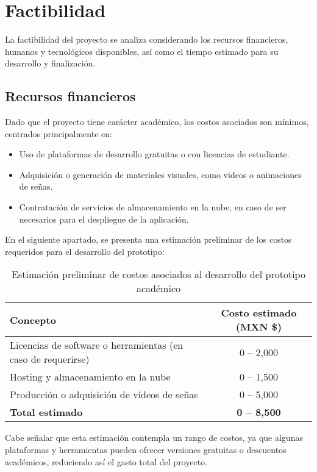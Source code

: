 \section{Factibilidad}
La factibilidad del proyecto se analiza considerando los recursos financieros, humanos y tecnológicos disponibles, así como el tiempo estimado para su desarrollo y finalización.

\subsection{Recursos financieros}
Dado que el proyecto tiene carácter académico, los costos asociados son mínimos, centrados principalmente en:
\begin{itemize}
	\item Uso de plataformas de desarrollo gratuitas o con licencias de estudiante.
	\item Adquisición o generación de materiales visuales, como videos o animaciones de señas.
	\item Contratación de servicios de almacenamiento en la nube, en caso de ser necesarios para el despliegue de la aplicación.
\end{itemize}

En el siguiente apartado, se presenta una estimación preliminar de los costos requeridos para el desarrollo del prototipo:

\begin{table}[H]
	\centering
	\begin{tabular}{|p{8cm}|c|}
		\hline
		\textbf{Concepto} & \textbf{Costo estimado (MXN \$)} \\ \hline
		Licencias de software o herramientas (en caso de requerirse) & 0 -- 2,000 \\ \hline
		Hosting y almacenamiento en la nube & 0 -- 1,500 \\ \hline
		Producción o adquisición de videos de señas & 0 -- 5,000 \\ \hline
		\textbf{Total estimado} & \textbf{0 -- 8,500} \\ \hline
	\end{tabular}
	\caption{Estimación preliminar de costos asociados al desarrollo del prototipo académico}
	\label{tab:costos-prototipo}
\end{table}


Cabe señalar que esta estimación contempla un rango de costos, ya que algunas plataformas y herramientas pueden ofrecer versiones gratuitas o descuentos académicos, reduciendo así el gasto total del proyecto.

